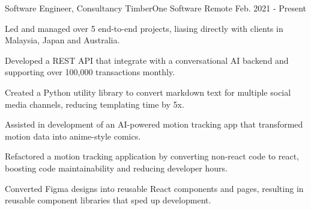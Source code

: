

\begin{cventries}

  \cventry
    {Software Engineer, Consultancy} %
    {TimberOne Software} %
    {Remote} %
    {Feb. 2021 - Present} %
    {
      \begin{cvitems} %
        \item {Led and managed over 5 end-to-end projects, liasing directly with clients in Malaysia, Japan and Australia.}
        \item {Developed a REST API that integrate with a conversational AI backend and supporting over 100,000 transactions monthly.}
        \item {Created a Python utility library to convert markdown text for multiple social media channels, reducing templating time by 5x.}
        \item {Assisted in development of an AI-powered motion tracking app that transformed motion data into anime-style comics.}
        \item {Refactored a motion tracking application by converting non-react code to react, boosting code maintainability and reducing developer hours.}
        \item {Converted Figma designs into reusable React components and pages, resulting in reusable component libraries that sped up development.}
      \end{cvitems}
    }


\end{cventries}
